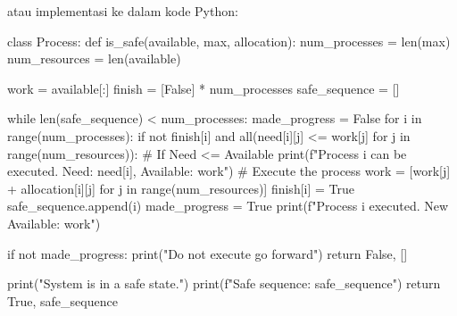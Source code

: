 \documentclass[12pt]{article}
\begin{document}
\begin{itemize}
\begin{enumerate}
        atau implementasi ke dalam kode Python:
        \begin{python}
            class Process:
                def is_safe(available, max, allocation):
                    num_processes = len(max)
                    num_resources = len(available)

                    work = available[:]
                    finish = [False] * num_processes
                    safe_sequence = []

                    while len(safe_sequence) < num_processes:
                        made_progress = False
                        for i in range(num_processes):
                            if not finish[i] and all(need[i][j] <= work[j] for j in range(num_resources)):
                                # If Need <= Available
                                print(f"Process {i} can be executed. Need: {need[i]}, Available: {work}")
                                # Execute the process
                                work = [work[j] + allocation[i][j] for j in range(num_resources)]
                                finish[i] = True
                                safe_sequence.append(i)
                                made_progress = True
                                print(f"Process {i} executed. New Available: {work}")

                        if not made_progress:
                            print("Do not execute go forward")
                            return False, []

                    print("System is in a safe state.")
                    print(f"Safe sequence: {safe_sequence}")
                    return True, safe_sequence
        \end{python}


\end{enumerate}
\end{itemize}
\end{document}
